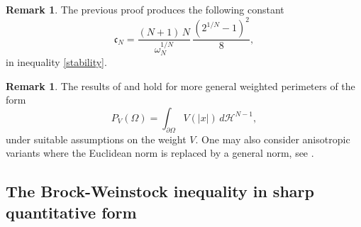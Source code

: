 \documentclass{amsart}
\theoremstyle{definition}
\newtheorem{remark}[lemma]{Remark}
\numberwithin{equation}{section}
\begin{document}
\begin{remark}
\label{oss:costanteberry}
The previous proof produces the following constant
\begin{equation}
\label{costanteberry}
\mathfrak{c}_{N}=\frac{(N+1)\,N}{\omega_N^{1/N}}\,\frac{(2^{1/N}-1)^2}{8},
\end{equation}
in inequality \eqref{stability}.
\end{remark}
\begin{remark}
The results of \cite{MR1734159} and \cite{MR2913683} hold for more general weighted perimeters of the form
\[
P_V(\Omega)=\int_{\partial \Omega} V(|x|)\,d\mathcal{H}^{N-1},
\]
under suitable assumptions on the weight $V$. One may also consider anisotropic variants where the Euclidean norm is replaced by a general norm, see \cite[Appendix A]{MR3128695}.
\end{remark}

\subsection{The Brock-Weinstock inequality in sharp quantitative form}
\end{document}
